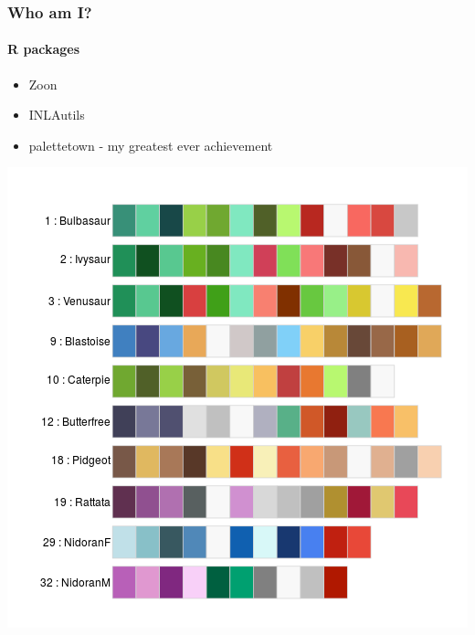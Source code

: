 \documentclass{beamer}
\begin{document}
\begin{frame}
\frametitle{Who am I?}
\framesubtitle{R packages}
	\begin{itemize}
	\item Zoon 
	\item INLAutils
	\item palettetown - my greatest ever achievement
	\end{itemize}	
	\centerline{
    \includegraphics[height = 0.59\textheight]{pokedex-4.png}
	}
\end{frame} 
\end{document}
